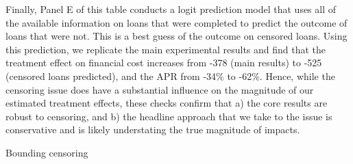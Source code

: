 Finally, Panel E of this table conducts a logit prediction model that uses all of the available information on loans that were completed to predict the outcome of loans that were not.  This is a best guess of the outcome on censored loans.  Using this prediction, we replicate the main experimental results and find that the treatment effect on financial cost increases from -378 (main results) to -525 (censored loans predicted), and the APR from -34\% to -62\%.  Hence, while the censoring issue does have a substantial influence on the magnitude of our estimated treatment effects, these  checks confirm that a) the core results are robust to censoring, and b) the headline approach that we take to the issue is conservative and is likely understating the true magnitude of impacts.

\vspace{.3in}
\begin{table}[H]
\caption{Bounding censoring} 
\label{bounding_censoring}
\begin{center}
\resizebox{0.9\textwidth}{!}{
\scriptsize{}
}
\end{center}
 \scriptsize 
\end{table}

